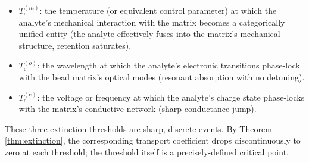 \documentclass[twocolumn,10pt,a4paper]{article}
\theoremstyle{definition}
\theoremstyle{remark}
\newcommand{\TcM}{T_{\mathrm{c}}^{(m)}}
\newcommand{\TcO}{T_{\mathrm{c}}^{(o)}}
\newcommand{\TcE}{T_{\mathrm{c}}^{(e)}}
\begin{document}
\begin{itemize}[leftmargin=1.2em,nosep]
\item $\TcM$: the temperature (or equivalent control parameter) at which the analyte's mechanical interaction with the matrix becomes a categorically unified entity (the analyte effectively fuses into the matrix's mechanical structure, retention saturates).
\item $\TcO$: the wavelength at which the analyte's electronic transitions phase-lock with the bead matrix's optical modes (resonant absorption with no detuning).
\item $\TcE$: the voltage or frequency at which the analyte's charge state phase-locks with the matrix's conductive network (sharp conductance jump).
\end{itemize}

These three extinction thresholds are sharp, discrete events. By Theorem \ref{thm:extinction}, the corresponding transport coefficient drops discontinuously to zero at each threshold; the threshold itself is a precisely-defined critical point.
\end{document}
